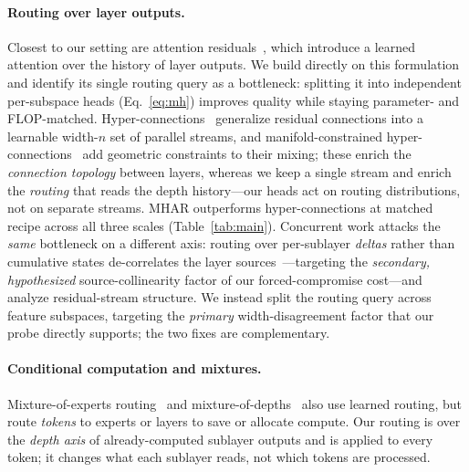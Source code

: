 \documentclass{article}
\begin{document}
\paragraph{Routing over layer outputs.} Closest to our setting are attention
residuals~\citep{kimi2025attention}, which introduce a learned attention over the
history of layer outputs. We build directly on this formulation and identify its
single routing query as a bottleneck: splitting it into independent per-subspace
heads (Eq.~\ref{eq:mh}) improves quality while staying parameter- and FLOP-matched.
Hyper-connections~\citep{zhu2024hyperconnections} generalize residual connections
into a learnable width-$n$ set of parallel streams, and
manifold-constrained hyper-connections~\citep{deepseek2025mhc} add geometric
constraints to their mixing; these enrich the \emph{connection topology} between
layers, whereas we keep a single stream and enrich the \emph{routing} that reads the
depth history---our heads act on routing distributions, not on separate streams. MHAR
outperforms hyper-connections at matched recipe across all three scales
(Table~\ref{tab:main}). Concurrent work attacks the \emph{same} bottleneck on a
different axis: routing over per-sublayer \emph{deltas} rather than cumulative states
de-correlates the layer sources~\citep{zhang2026ddl}---targeting the \emph{secondary,
hypothesized} source-collinearity factor of our forced-compromise cost---and
\citet{zhang2026duality} analyze residual-stream structure. We instead split the
routing query across feature subspaces, targeting the \emph{primary} width-disagreement
factor that our probe directly supports; the two fixes are complementary.

\paragraph{Conditional computation and mixtures.} Mixture-of-experts
routing~\citep{shazeer2017moe,fedus2022switch} and mixture-of-depths~\citep{raposo2024mixture}
also use learned routing, but route \emph{tokens} to experts or layers to save or
allocate compute. Our routing is over the \emph{depth axis} of already-computed
sublayer outputs and is applied to every token; it changes what each sublayer
reads, not which tokens are processed.
\end{document}
